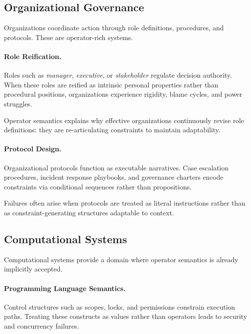 \documentclass[11pt]{article}
\begin{document}
\subsection{Organizational Governance}

Organizations coordinate action through role definitions, procedures, and
protocols. These are operator-rich systems.

\paragraph{Role Reification.}
Roles such as \emph{manager}, \emph{executive}, or \emph{stakeholder} regulate
decision authority. When these roles are reified as intrinsic personal properties
rather than procedural positions, organizations experience rigidity, blame
cycles, and power struggles.

Operator semantics explains why effective organizations continuously revise role
definitions: they are re-articulating constraints to maintain adaptability.

\paragraph{Protocol Design.}
Organizational protocols function as executable narratives. Case escalation
procedures, incident response playbooks, and governance charters encode
constraints via conditional sequences rather than propositions.

Failures often arise when protocols are treated as literal instructions rather
than as constraint-generating structures adaptable to context.

\subsection{Computational Systems}

Computational systems provide a domain where operator semantics is already
implicitly accepted.

\paragraph{Programming Language Semantics.}
Control structures such as scopes, locks, and permissions constrain execution
paths. Treating these constructs as values rather than operators leads to security
and concurrency failures.
\end{document}
